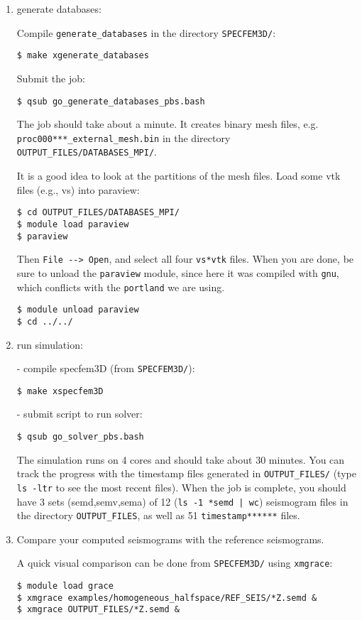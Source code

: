 \documentclass[10pt,fleqn,letterpaper]{article}
\begin{document}
\begin{enumerate}
\item generate databases:

Compile \verb+generate_databases+ in the directory \verb+SPECFEM3D/+:
\begin{lstlisting}
$ make xgenerate_databases
\end{lstlisting}
Submit the job:
\begin{lstlisting}
$ qsub go_generate_databases_pbs.bash
\end{lstlisting}

The job should take about a minute.
It creates binary mesh files, e.g. \verb+proc000***_external_mesh.bin+ in the directory \verb+OUTPUT_FILES/DATABASES_MPI/+.

It is a good idea to look at the partitions of the mesh files. Load some vtk files (e.g., vs) into paraview:
\begin{lstlisting}
$ cd OUTPUT_FILES/DATABASES_MPI/
$ module load paraview
$ paraview
\end{lstlisting}
%
Then \verb+File --> Open+, and select all four \verb+vs*vtk+ files. When you are done, be sure to unload the \verb+paraview+ module, since here it was compiled with \verb+gnu+, which conflicts with the \verb+portland+ we are using.
%
\begin{lstlisting}
$ module unload paraview
$ cd ../../
\end{lstlisting}

\item run simulation:

   - compile specfem3D (from \verb+SPECFEM3D/+):
\begin{lstlisting}
$ make xspecfem3D
\end{lstlisting}
   - submit script to run solver:
\begin{lstlisting}
$ qsub go_solver_pbs.bash
\end{lstlisting}

The simulation runs on 4 cores and should take about 30 minutes. You can track the progress with the timestamp files generated in \verb+OUTPUT_FILES/+ (type \verb+ls -ltr+ to see the most recent files). When the job is complete, you should have 3 sets (semd,semv,sema) of 12 (\verb+ls -1 *semd | wc+) seismogram files in the directory \verb+OUTPUT_FILES+, as well as 51 \verb+timestamp******+ files.

\item Compare your computed seismograms with the reference seismograms.

A quick visual comparison can be done from \verb+SPECFEM3D/+ using \verb+xmgrace+:
\begin{lstlisting}
$ module load grace
$ xmgrace examples/homogeneous_halfspace/REF_SEIS/*Z.semd &
$ xmgrace OUTPUT_FILES/*Z.semd &
\end{lstlisting}

\end{enumerate}
\end{document}
